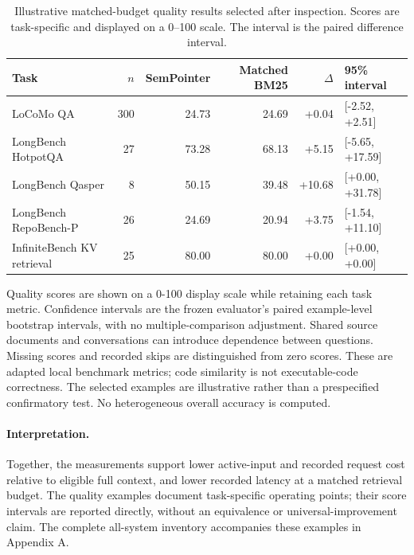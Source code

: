 \begin{table}[t]\centering\scriptsize\setlength{\tabcolsep}{3pt}
\caption{Illustrative matched-budget quality results selected after inspection. Scores are task-specific and displayed on a 0--100 scale. The interval is the paired difference interval.}
\label{tab:kaggle_examples}
\begin{tabular}{lrrrrl}\toprule
Task & $n$ & SemPointer & Matched BM25 & $\Delta$ & 95\% interval \\ \midrule
LoCoMo QA & 300 & 24.73 & 24.69 & +0.04 & [-2.52, +2.51] \\
LongBench HotpotQA & 27 & 73.28 & 68.13 & +5.15 & [-5.65, +17.59] \\
LongBench Qasper & 8 & 50.15 & 39.48 & +10.68 & [+0.00, +31.78] \\
LongBench RepoBench-P & 26 & 24.69 & 20.94 & +3.75 & [-1.54, +11.10] \\
InfiniteBench KV retrieval & 25 & 80.00 & 80.00 & +0.00 & [+0.00, +0.00] \\
\bottomrule\end{tabular}\end{table}
Quality scores are shown on a 0-100 display scale while retaining each task metric. Confidence intervals are the frozen evaluator's paired example-level bootstrap intervals, with no multiple-comparison adjustment. Shared source documents and conversations can introduce dependence between questions. Missing scores and recorded skips are distinguished from zero scores. These are adapted local benchmark metrics; code similarity is not executable-code correctness. The selected examples are illustrative rather than a prespecified confirmatory test. No heterogeneous overall accuracy is computed.


\paragraph{Interpretation.}
Together, the measurements support lower active-input and recorded request cost relative to eligible full context, and lower recorded latency at a matched retrieval budget. The quality examples document task-specific operating points; their score intervals are reported directly, without an equivalence or universal-improvement claim. The complete all-system inventory accompanies these examples in Appendix A.


